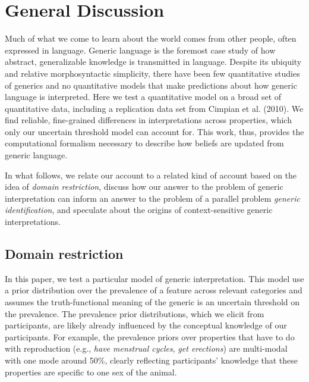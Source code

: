 \documentclass[floatsintext,doc]{apa6}
\theoremstyle{definition}
\theoremstyle{definition}
\theoremstyle{definition}
\theoremstyle{remark}
\begin{document}
\section{General Discussion}\label{general-discussion}

Much of what we come to learn about the world comes from other people,
often expressed in language. Generic language is the foremost case study
of how abstract, generalizable knowledge is transmitted in language.
Despite its ubiquity and relative morphosyntactic simplicity, there have
been few quantitative studies of generics and no quantitative models
that make predictions about how generic language is interpreted. Here we
test a quantitative model on a broad set of quantitative data, including
a replication data set from Cimpian et al. (2010). We find reliable,
fine-grained differences in interpretations across properties, which
only our uncertain threshold model can account for. This work, thus,
provides the computational formalism necessary to describe how beliefs
are updated from generic language.

In what follows, we relate our account to a related kind of account
based on the idea of \emph{domain restriction}, discuss how our answer
to the problem of generic interpretation can inform an answer to the
problem of a parallel problem \emph{generic identification}, and
speculate about the origins of context-sensitive generic
interpretations.




\subsection{Domain restriction}\label{domain-restriction}

In this paper, we test a particular model of generic interpretation.
This model use a prior distribution over the prevalence of a feature
across relevant categories and assumes the truth-functional meaning of
the generic is an uncertain threshold on the prevalence. The prevalence
prior distributions, which we elicit from participants, are likely
already influenced by the conceptual knowledge of our participants. For
example, the prevalence priors over properties that have to do with
reproduction (e.g., \emph{have menstrual cycles}, \emph{get erections})
are multi-modal with one mode around 50\%, clearly reflecting
participants' knowledge that these properties are specific to one sex of
the animal.
\end{document}
